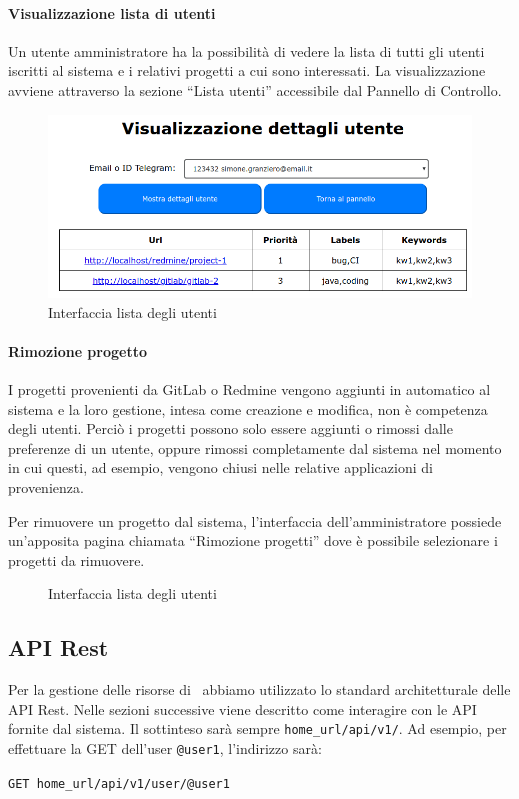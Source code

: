 \paragraph{Visualizzazione lista di utenti}
Un utente amministratore ha la possibilità di vedere la lista di tutti gli utenti iscritti al sistema e i relativi progetti a cui sono interessati.
La visualizzazione avviene attraverso la sezione ``Lista utenti'' accessibile dal Pannello di Controllo.
\begin{figure}[H]
	\centering
	\includegraphics[width=12cm]{img/user_details.png}
	\caption{Interfaccia lista degli utenti}
\end{figure}

\paragraph{Rimozione progetto}
I progetti provenienti da GitLab o Redmine vengono aggiunti in automatico al sistema e la loro gestione, intesa come creazione e modifica, non è competenza degli utenti. Perciò i progetti possono solo essere aggiunti o rimossi dalle preferenze di un utente, oppure rimossi completamente dal sistema nel momento in cui questi, ad esempio, vengono chiusi nelle relative applicazioni di provenienza. \par
Per rimuovere un progetto dal sistema, l'interfaccia dell'amministratore possiede un'apposita pagina chiamata ``Rimozione progetti'' dove è possibile selezionare i progetti da rimuovere.
\begin{figure}[H]
	\centering
	\caption{Interfaccia lista degli utenti}
\end{figure}

\subsection{API Rest}\label{APIRest}
\newcommand{\homeUrl}{home\_url}

Per la gestione delle risorse di \progetto\ abbiamo utilizzato lo standard architetturale delle API Rest.
Nelle sezioni successive viene descritto come interagire con le API fornite dal sistema.
Il  sottinteso sarà sempre \texttt{\homeUrl/api/v1/}.
Ad esempio, per effettuare la GET dell'user \texttt{@user1}, l'indirizzo sarà:
\begin{center}
    \texttt{GET \homeUrl/api/v1/user/@user1}
\end{center}

